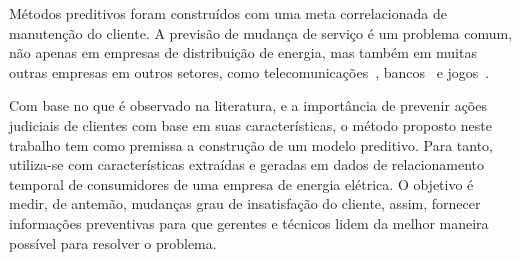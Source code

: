 \documentclass[../main.tex]{subfiles}
\begin{document}
Métodos preditivos foram construídos com uma meta correlacionada de manutenção do cliente. A previsão de mudança de serviço é um problema comum, não apenas em empresas de distribuição de energia, mas também em muitas outras empresas em outros setores, como telecomunicações~, bancos~ e jogos~.


Com base no que é observado na literatura, e a importância de prevenir ações judiciais de clientes com base em suas características, o método proposto neste trabalho tem como premissa a construção de um modelo preditivo. Para tanto, utiliza-se com características extraídas e geradas em dados de relacionamento temporal de consumidores de uma empresa de energia elétrica. O objetivo é medir, de antemão, mudanças grau de insatisfação do cliente, assim, fornecer informações preventivas para que gerentes e técnicos lidem da melhor maneira possível para resolver o problema.

\end{document}
